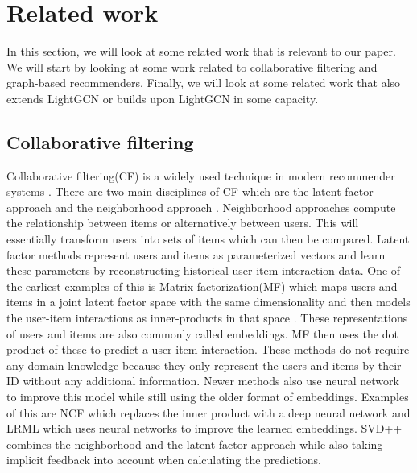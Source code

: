 \section{Related work}
In this section, we will look at some related work that is relevant to our paper.
We will start by looking at some work related to collaborative filtering and graph-based recommenders.
Finally, we will look at some related work that also extends LightGCN or builds upon LightGCN in some capacity.

\subsection{Collaborative filtering}
Collaborative filtering(CF) is a widely used technique in modern recommender systems \cite{lightgcn}.
There are two main disciplines of CF which are the latent factor approach and the neighborhood approach \cite{SVD}.
Neighborhood approaches compute the relationship between items or alternatively between users.
This will essentially transform users into sets of items which can then be compared.
Latent factor methods represent users and items as parameterized vectors and learn these parameters by reconstructing historical user-item interaction data.
One of the earliest examples of this is Matrix factorization(MF) which maps users and items in a joint latent factor space with the same dimensionality and then models the user-item interactions as inner-products in that space \cite{Matrix-factorization-techniques}.
These representations of users and items are also commonly called embeddings.
MF then uses the dot product of these to predict a user-item interaction.
These methods do not require any domain knowledge because they only represent the users and items by their ID without any additional information.
Newer methods also use neural network to improve this model while still using the older format of embeddings. 
Examples of this are NCF \cite{NCF} which replaces the inner product with a deep neural network and LRML\cite{LRML} which uses neural networks to improve the learned embeddings.
SVD++ \cite{SVD} combines the neighborhood and the latent factor approach while also taking implicit feedback into account when calculating the predictions.

